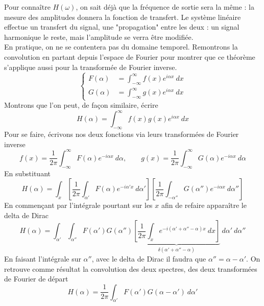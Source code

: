 Pour connaître $H(\omega)$, on sait déjà que la fréquence de sortie sera la même : la mesure 
des amplitudes donnera la fonction de transfert. Le système linéaire effectue un transfert 
du signal, une "propagation" entre les deux : un signal harmonique le reste, mais l'amplitude 
se verra être modifiée.\\

En pratique, on ne se contentera pas du domaine temporel. Remontrons la convolution en partant 
depuis l'espace de Fourier pour montrer que ce théorème s'applique aussi pour la transformée 
de Fourier inverse.
\begin{equation}
\left\{\begin{array}{ll}
F(\alpha) &= \int_{-\infty}^\infty f(x)e^{i\alpha x}\ dx\\
G(\alpha) &= \int_{-\infty}^\infty g(x)e^{i\alpha x}\ dx
\end{array}\right.
\end{equation}
Montrons que l'on peut, de façon similaire, écrire
\begin{equation}
H(\alpha) = \int_{-\infty}^\infty f(x)g(x)e^{i\alpha x}\ dx
\end{equation}
Pour se faire, écrivons nos deux fonctions via leurs transformées de Fourier inverse
\begin{equation}
f(x) = \frac{1}{2\pi}\int_{-\infty}^\infty F(\alpha)e^{-i\alpha x}\ d\alpha,\qquad 
g(x) = \frac{1}{2\pi}\int_{-\infty}^\infty G(\alpha)e^{-i\alpha x}\ d\alpha
\end{equation}
En substituant
\begin{equation}
H(\alpha) = \int_x \left[\dfrac{1}{2\pi}\int_{\alpha'} F(\alpha)e^{-i\alpha' x}\ d\alpha'
 \right]\left[\frac{1}{2\pi}\int_{-\alpha''} G(\alpha'')e^{-i\alpha x}\ d\alpha'' \right]
\end{equation}
En commençant par l'intégrale pourtant sur les $x$ afin de refaire apparaître le 
delta de Dirac
\begin{equation}
H(\alpha) = \int_{\alpha'}\int_{\alpha''} F(\alpha')G(\alpha'')\underbrace{\left[\dfrac{1}{2\pi}\int_x 
e^{-i(\alpha'+ \alpha'' -\alpha )x}\ dx\right]}_{\delta(\alpha'+ \alpha'' -\alpha)}\ d\alpha'\ d\alpha''
\end{equation}
En faisant l'intégrale sur $\alpha''$, avec le delta de Dirac il faudra que $\alpha'' = \alpha-\alpha'$. 
On retrouve comme résultat la convolution des deux spectres, des deux transformées de Fourier de 
départ 
\begin{equation}
H(\alpha) = \frac{1}{2\pi}\int_{\alpha'} F(\alpha')G(\alpha-\alpha')\ d\alpha'
\end{equation}

